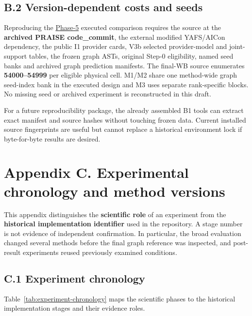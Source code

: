 \documentclass[10pt,a4paper]{article}
\begin{document}
\subsection*{B.2 Version-dependent costs and seeds}

Reproducing the \hyperref[app:experiment-stages]{Phase-5} executed comparison requires the source at the \textbf{archived PRAISE code\_commit}, the external modified YAFS/AICon dependency, the public I1 provider cards, V3b selected provider-model and joint-support tables, the frozen graph ASTs, original Step-0 eligibility, named seed banks and archived graph prediction manifests. The final-WB source enumerates \textbf{54000–54999} per eligible physical cell. M1/M2 share one method-wide graph seed-index bank in the executed design and M3 uses separate rank-specific blocks. No missing seed or archived experiment is reconstructed in this draft.

For a future reproducibility package, the already assembled B1 tools can extract exact manifest and source hashes without touching frozen data. Current installed source fingerprints are useful but cannot replace a historical environment lock if byte-for-byte results are desired.

\section*{Appendix C. Experimental chronology and method versions}
\label{app:experiment-stages}
\setcounter{table}{0}
\renewcommand{\thetable}{C.\arabic{table}}
\providecommand{\theHtable}{}
\renewcommand{\theHtable}{C.\arabic{table}}

This appendix distinguishes the \textbf{scientific role} of an experiment from the \textbf{historical implementation identifier} used in the repository. A stage number is not evidence of independent confirmation. In particular, the broad evaluation changed several methods before the final graph reference was inspected, and post-result experiments reused previously examined conditions.

\subsection*{C.1 Experiment chronology}

Table~\ref{tab:experiment-chronology} maps the scientific phases to the historical implementation stages and their evidence roles.
\end{document}

